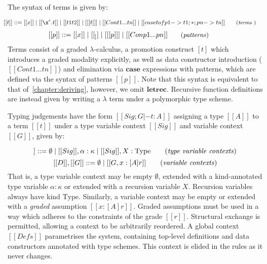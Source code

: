 The syntax of terms is given by:

\begin{align*}
        \hspace{-0.8em} [[ t ]] ::= \;
               & [[ x ]]
          \mid [[ \x ^ c . t ]]
          \mid [[ t1 t2 ]]
          \mid [[ [t] ]]
          \mid [[ Con t1 ... tn ]]
          \mid [[ case t of p1 -> t1 ; * ; pn -> tn  ]]
        {\small{\tag{\textit{terms} }}}
\end{align*}
\begin{align*}
  \vspace{-1em}
        \hspace{-0.8em} [[ p ]] ::= \;
               & [[ x ]]
          \mid [[ _ ]]
          \mid [[ [p] ]]
          \mid [[ Con p1 ... pn ]]
        {\small{\tag{\textit{patterns}}}}
\end{align*}
Terms consist of a graded $\lambda$-calculus, a promotion construct $[t]$ which
 introduces a graded modality explicitly, as well as data constructor
 introduction ($[[ Con t1 ... tn ]]$) and elimination via $\textbf{case}$
 expressions with patterns, which are defined via the syntax of patterns $[[ p
 ]]$. Note that this syntax is equivalent to that of~\ref{chapter:deriving},
 however, we omit $\textbf{letrec}$. Recursive function
 definitions are instead given by writing a $\lambda$ term under a polymorphic
 type scheme. 

Typing judgements have the form $[[  Sig ; G |- t : A ]]$ assigning a type $[[ A
]]$ to a term $ [[ t ]]$ under a type variable context $[[ Sig ]]$ and variable context
$[[ G ]]$, given by:

\begin{equation*}
  [[ Sig ]] ::= \emptyset
  \mid [[ Sig ]], \alpha : \kappa
  \mid [[ Sig ]], X : \text{Type}
\tag{\textit{type variable contexts}}
\end{equation*}
\begin{equation*}
  \vspace{-1em}
  [[ D ]], [[ G ]] ::= \emptyset
  \mid [[ G , x : [ A ] r ]]
\tag{\textit{variable contexts}}
\end{equation*}
%
That is, a type variable context may be empty $\emptyset$, extended with a
kind-annotated type variable $\alpha : \kappa$ or extended with a recursion
variable $X$. Recursion variables always have kind $\text{Type}$. Similarly, a
variable context may be empty or extended with a \textit{graded} assumption $ [[
x : [A] r ]]$. Graded assumptions must be used in a way which adheres to the
constraints of the grade $[[ r ]]$. Structural exchange is permitted, allowing a
context to be arbitrarily reordered. A global context $[[ Defs ]]$ parametrises
the system, containing top-level definitions and data constructors annotated
with type schemes. This context is elided in the rules as it never changes.

